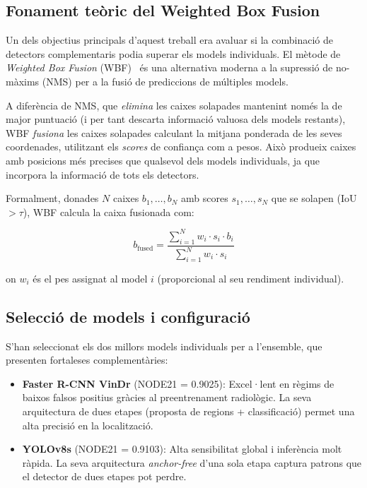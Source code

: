 \documentclass[conference]{IEEEtran}
\begin{document}
\subsection{Fonament teòric del Weighted Box Fusion}

Un dels objectius principals d'aquest treball era avaluar si la combinació de detectors complementaris podia superar els models individuals. El mètode de \textit{Weighted Box Fusion} (WBF)~\cite{solovyev2021wbf} és una alternativa moderna a la supressió de no-màxims (NMS) per a la fusió de prediccions de múltiples models.

A diferència de NMS, que \textit{elimina} les caixes solapades mantenint només la de major puntuació (i per tant descarta informació valuosa dels models restants), WBF \textit{fusiona} les caixes solapades calculant la mitjana ponderada de les seves coordenades, utilitzant els \textit{scores} de confiança com a pesos. Això produeix caixes amb posicions més precises que qualsevol dels models individuals, ja que incorpora la informació de tots els detectors.

Formalment, donades $N$ caixes $b_1, \ldots, b_N$ amb scores $s_1, \ldots, s_N$ que se solapen (IoU $> \tau$), WBF calcula la caixa fusionada com:

\begin{equation}
    b_{\text{fused}} = \frac{\sum_{i=1}^{N} w_i \cdot s_i \cdot b_i}{\sum_{i=1}^{N} w_i \cdot s_i}
\end{equation}

on $w_i$ és el pes assignat al model $i$ (proporcional al seu rendiment individual).

\subsection{Selecció de models i configuració}

S'han seleccionat els dos millors models individuals per a l'ensemble, que presenten fortaleses complementàries:

\begin{itemize}
    \item \textbf{Faster R-CNN VinDr} (NODE21 = 0.9025): Excel·lent en règims de baixos falsos positius gràcies al preentrenament radiològic. La seva arquitectura de dues etapes (proposta de regions + classificació) permet una alta precisió en la localització.
    \item \textbf{YOLOv8s} (NODE21 = 0.9103): Alta sensibilitat global i inferència molt ràpida. La seva arquitectura \textit{anchor-free} d'una sola etapa captura patrons que el detector de dues etapes pot perdre.
\end{itemize}
\end{document}
